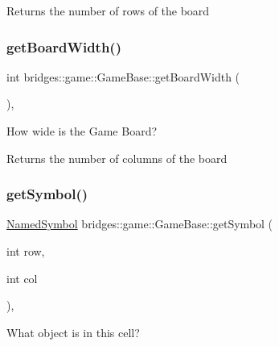 \begin{DoxyReturn}{Returns}
the number of rows of the board 
\end{DoxyReturn}
\mbox{\label{classbridges_1_1game_1_1_game_base_ad74bf992cced25e9997fbf8a63bf8157}} 
\subsubsection{\texorpdfstring{get\+Board\+Width()}{getBoardWidth()}}
{\footnotesize\ttfamily int bridges\+::game\+::\+Game\+Base\+::get\+Board\+Width (\begin{DoxyParamCaption}{ }\end{DoxyParamCaption})\hspace{0.3cm}{\ttfamily [inline]}, {\ttfamily [protected]}}



How wide is the Game Board? 

\begin{DoxyReturn}{Returns}
the number of columns of the board 
\end{DoxyReturn}
\mbox{\label{classbridges_1_1game_1_1_game_base_a0dfec715b0ed49c37b4b6689f2470b25}} 
\subsubsection{\texorpdfstring{get\+Symbol()}{getSymbol()}}
{\footnotesize\ttfamily \hyperlink{namespacebridges_1_1game_ab9a19c7ab6e2ebac2f95180e21733487}{Named\+Symbol} bridges\+::game\+::\+Game\+Base\+::get\+Symbol (\begin{DoxyParamCaption}\item[{int}]{row,  }\item[{int}]{col }\end{DoxyParamCaption})\hspace{0.3cm}{\ttfamily [inline]}, {\ttfamily [protected]}}



What object is in this cell? 


